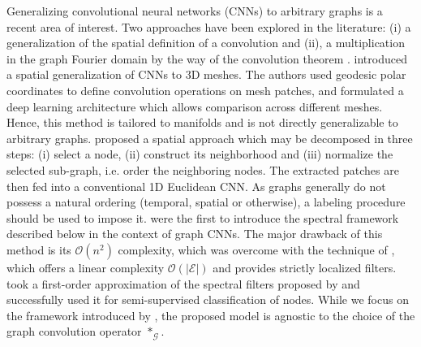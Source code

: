 \documentclass{article}
\newcommand{\todo}[1]{{\color{red} #1 }}
\newcommand{\bO}{\mathcal{O}}
\newcommand{\G}{\mathcal{G}}
\newcommand{\E}{\mathcal{E}}
\begin{document}
Generalizing convolutional neural networks (CNNs) to arbitrary graphs is a
recent area of interest. Two approaches have been explored in the literature: (i) a
generalization of the spatial definition of a convolution \citep{gcnn_masci,
gcnn_niepert} and (ii), a multiplication in the graph Fourier domain by the way
of the convolution theorem \citep{gcnn_bruna, gcnn}. \citet{gcnn_masci}
introduced a spatial generalization of CNNs to 3D meshes. The authors used
geodesic polar coordinates to define convolution operations on mesh patches,
and formulated a deep learning architecture which allows comparison across
different meshes.  Hence, this method is tailored to manifolds and is not directly
generalizable to arbitrary graphs. \citet{gcnn_niepert} proposed a spatial
approach which may be decomposed in three steps: (i) select a node, (ii)
construct its neighborhood and (iii) normalize the selected sub-graph, i.e.
order the neighboring nodes. The extracted patches are then fed into a
conventional 1D Euclidean CNN. As graphs generally do not possess a natural ordering
(temporal, spatial or otherwise), a labeling procedure should be used to impose
it. \citet{gcnn_bruna} were the first to introduce the spectral framework
described below in the context of graph CNNs. The major drawback of this
method is its $\bO(n^2)$ complexity, which was overcome with the technique of \citet{gcnn}, which offers a linear complexity $\bO(|\E|)$ and provides strictly localized
filters. \citet{gcnn_kipf} took a first-order approximation of the spectral
filters proposed by \citet{gcnn} and successfully used it for semi-supervised
classification of nodes. While we focus on the framework introduced by
\citet{gcnn}, the proposed model is agnostic to the choice of the graph
convolution operator $\ast_\G$. %
\end{document}
